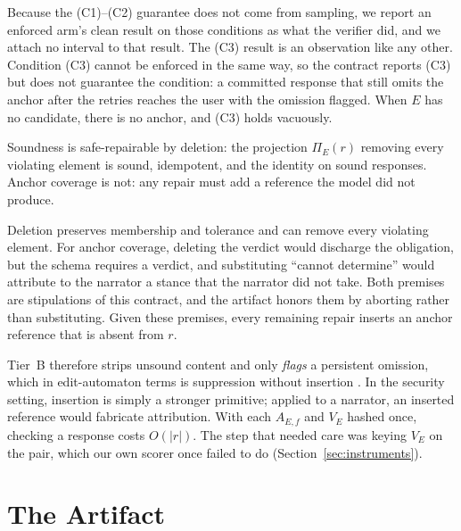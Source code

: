 \documentclass[smallextended,natbib]{svjour3}
\begin{document}
Because the (C1)--(C2) guarantee does not come from sampling, we report an
enforced arm's clean result on those conditions as what the verifier did, and
we attach no interval to that result. The (C3) result is an observation like
any other. Condition (C3) cannot be enforced in the same way, so the contract
reports (C3) but does not guarantee the condition: a committed response that still omits
the anchor after the retries reaches the user with the omission flagged. When
$E$ has no candidate, there is no anchor, and (C3) holds vacuously.

\begin{observation}\label{prop:asym}
Soundness is safe-repairable by deletion: the projection $\Pi_E(r)$ removing
every violating element is sound, idempotent, and the identity on sound
responses. Anchor coverage is not: any repair must add a reference the model
did not produce.
\end{observation}

\begin{proofsketch}
Deletion preserves membership and tolerance and can remove every violating
element. For anchor coverage, deleting the verdict would discharge the
obligation, but the schema requires a verdict, and substituting ``cannot
determine'' would attribute to the narrator a stance that the narrator did not
take. Both premises are stipulations of this contract, and the artifact honors
them by aborting rather than substituting. Given these premises, every
remaining repair inserts an anchor reference that is absent from $r$.
\end{proofsketch}

Tier~B therefore strips unsound content and only \emph{flags} a persistent
omission, which in edit-automaton terms is suppression without
insertion \citep{ligatti2005edit}. In the security setting, insertion is simply
a stronger primitive; applied to a narrator, an inserted reference would
fabricate attribution. With each $A_{E,f}$ and $V_E$ hashed once, checking a
response costs $O(|r|)$. The step that needed care was keying $V_E$ on the
pair, which our own scorer once failed to do (Section~\ref{sec:instruments}).

\section{The Artifact}\label{sec:contract}
\end{document}
